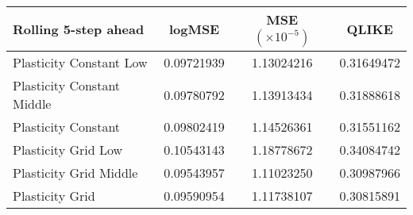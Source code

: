 
\begin{tabular}{l|c|c|c}
Rolling 5-step ahead     & logMSE & MSE $(\times 10^{-5})$ & QLIKE \\\hline
Plasticity Constant Low & 0.09721939 & 1.13024216 & 0.31649472\\ 
Plasticity Constant Middle & 0.09780792 & 1.13913434 & 0.31888618\\ 
Plasticity Constant & 0.09802419 & 1.14526361 & 0.31551162\\ 
Plasticity Grid Low & 0.10543143 & 1.18778672 & 0.34084742\\ 
Plasticity Grid Middle & 0.09543957 & 1.11023250 & 0.30987966\\ 
Plasticity Grid & 0.09590954 & 1.11738107 & 0.30815891\\ 
\end{tabular}